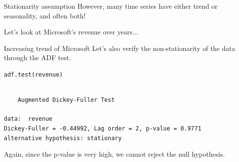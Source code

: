 \documentclass{beamer}\usepackage[]{graphicx}\usepackage[]{color}
\makeatletter
\newcommand{\hlnum}[1]{\textcolor[rgb]{0.824,0.412,0.118}{#1}}%
\newcommand{\hlcom}[1]{\textcolor[rgb]{0.824,0.706,0.549}{#1}}%
\newcommand{\hlopt}[1]{\textcolor[rgb]{1,0.894,0.769}{#1}}%
\newcommand{\hlstd}[1]{\textcolor[rgb]{1,0.894,0.769}{#1}}%
\newcommand{\hlkwb}[1]{\textcolor[rgb]{0.804,0.776,0.451}{#1}}%
\newcommand{\hlkwc}[1]{\textcolor[rgb]{0.78,0.941,0.545}{#1}}%
\newcommand{\hlkwd}[1]{\textcolor[rgb]{1,0.78,0.769}{#1}}%
\newenvironment{kframe}{%
 \def\at@end@of@kframe{}%
 \ifinner\ifhmode%
  \def\at@end@of@kframe{\end{minipage}}%
  \begin{minipage}{\columnwidth}%
 \fi\fi%
 \def\FrameCommand##1{\hskip\@totalleftmargin \hskip-\fboxsep
 \colorbox{shadecolor}{##1}\hskip-\fboxsep
     \hskip-\linewidth \hskip-\@totalleftmargin \hskip\columnwidth}%
 \MakeFramed {\advance\hsize-\width
   \@totalleftmargin\z@ \linewidth\hsize
   \@setminipage}}%
 {\par\unskip\endMakeFramed%
 \at@end@of@kframe}
\newenvironment{knitrout}{}{} %
\makeatother
\begin{document}
\begin{darkframes}
\begin{frame}[fragile]{Stationarity assumption}
      However, many time series have either trend or seasonality, and often both! \pause
      \bigskip
      
      Let's look at Microsoft's revenue over years...
      
      
    \end{frame}
    
    
    
    
    
    \begin{frame}[fragile]{Increasing trend of Microsoft}
    \fontsize{9}{9}\selectfont
      Let's also verify the non-stationarity of the data through the ADF test. \pause
    \bigskip
\begin{knitrout}
\begin{kframe}
\begin{alltt}
\hlkwd{adf.test}\hlstd{(revenue)}
\end{alltt}
\begin{verbatim}

	Augmented Dickey-Fuller Test

data:  revenue
Dickey-Fuller = -0.44992, Lag order = 2, p-value = 0.9771
alternative hypothesis: stationary
\end{verbatim}
\end{kframe}
\end{knitrout}
      \pause
      
      Again, since the p-value is very high, we cannot reject the null hypothesis.
    \end{frame}
    

\end{darkframes}
\end{document}
